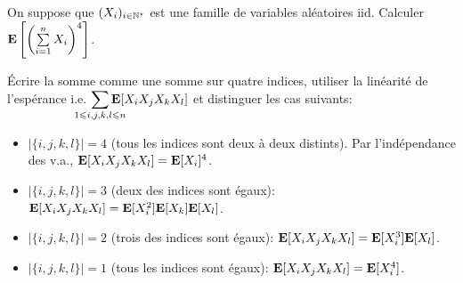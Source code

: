 \begin{exercice}
    On suppose que $(X_i)_{i \in \mathbb{N}^\star}$ est une famille de variables aléatoires iid. Calculer $\mathbf{E} \left [ \left (\sum\limits_{i=1}^{n} X_i \right)^4 \right]$.
\end{exercice}

\begin{elem_sol}
    Écrire la somme comme une somme sur quatre indices, utiliser la linéarité de l'espérance i.e. $\smashoperator{\sum\limits_{1 \leqslant i, j, k, l \leqslant n}} \E[X_i X_j X_k X_l]$ et distinguer les cas suivants:
    \begin{itemize}
        \item $|\{i, j, k, l \}| = 4$ (tous les indices sont deux à deux distints). Par l'indépendance des v.a., $\mathbf{E}[X_i X_j X_k X_l] = \mathbf{E}[X_i]^4$.
        \item $|\{i, j, k, l \}| = 3$ (deux des indices sont égaux): $\mathbf{E}[X_i X_j X_k X_l] = \mathbf{E}[X_i^2]\mathbf{E}[X_k]\mathbf{E}[X_l]$.
        \item $|\{i, j, k, l \}| = 2$ (trois des indices sont égaux): $\mathbf{E}[X_i X_j X_k X_l] = \mathbf{E}[X_i^3]\mathbf{E}[X_l]$.
        \item $|\{i, j, k, l \}| = 1$ (tous les indices sont égaux): $\mathbf{E}[X_i X_j X_k X_l] = \mathbf{E}[X_i^4]$.
    \end{itemize}
\end{elem_sol}